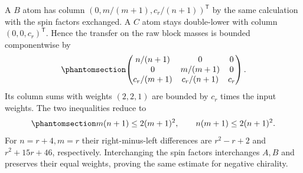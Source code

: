 \documentclass[
  english,
  11pt,
  reqno]{amsart}
\begin{document}
A \(B\) atom has column \((0,m/(m+1),c_r/(n+1))^{\mathsf T}\) by the
same calculation with the spin factors exchanged. A \(C\) atom stays
double-lower with column \((0,0,c_r)^{\mathsf T}\). Hence the transfer
on the raw block masses is bounded componentwise by
\begin{equation}\protect\phantomsection\label{eq:es-linear-transfer-matrix}{
 \begin{pmatrix}
 n/(n+1)&0&0\\
 0&m/(m+1)&0\\
 c_r/(m+1)&c_r/(n+1)&c_r
 \end{pmatrix}.
}\end{equation} Its column sums with weights \((2,2,1)\) are bounded by
\(c_r\) times the input weights. The two inequalities reduce to
\begin{equation}\protect\phantomsection\label{eq:es-weighted-column-inequalities}{
 m(n+1)\le2(m+1)^2,
 \qquad n(m+1)\le2(n+1)^2.
}\end{equation} For \(n=r+4,m=r\) their right-minus-left differences are
\(r^2-r+2\) and \(r^2+15r+46\), respectively. Interchanging the spin
factors interchanges \(A,B\) and preserves their equal weights, proving
the same estimate for negative chirality.
\end{document}
